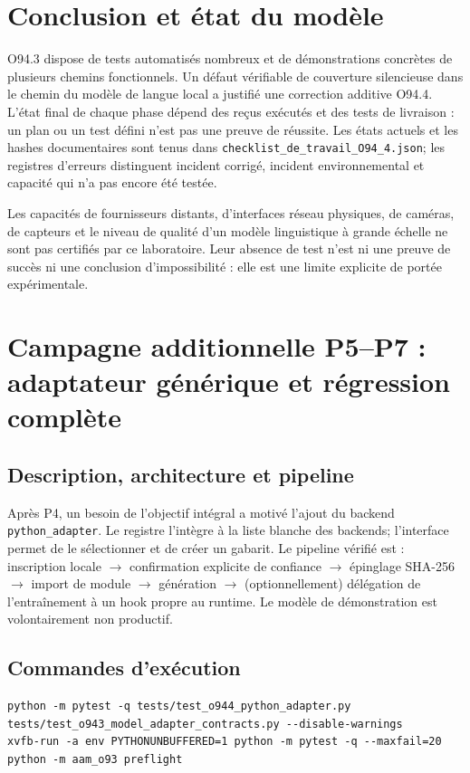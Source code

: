 \documentclass[11pt,a4paper]{article}
\begin{document}
\section{Conclusion et état du modèle}
O94.3 dispose de tests automatisés nombreux et de démonstrations concrètes de plusieurs chemins fonctionnels. Un défaut vérifiable de couverture silencieuse dans le chemin du modèle de langue local a justifié une correction additive O94.4. L'état final de chaque phase dépend des reçus exécutés et des tests de livraison : un plan ou un test défini n'est pas une preuve de réussite. Les états actuels et les hashes documentaires sont tenus dans \texttt{checklist\_de\_travail\_O94\_4.json}; les registres d'erreurs distinguent incident corrigé, incident environnemental et capacité qui n'a pas encore été testée.

Les capacités de fournisseurs distants, d'interfaces réseau physiques, de caméras, de capteurs et le niveau de qualité d'un modèle linguistique à grande échelle ne sont pas certifiés par ce laboratoire. Leur absence de test n'est ni une preuve de succès ni une conclusion d'impossibilité : elle est une limite explicite de portée expérimentale.
\section{Campagne additionnelle P5--P7 : adaptateur générique et régression complète}
\subsection{Description, architecture et pipeline}
Après P4, un besoin de l'objectif intégral a motivé l'ajout du backend \texttt{python\_adapter}. Le registre l'intègre à la liste blanche des backends; l'interface permet de le sélectionner et de créer un gabarit. Le pipeline vérifié est : inscription locale $\to$ confirmation explicite de confiance $\to$ épinglage SHA-256 $\to$ import de module $\to$ génération $\to$ (optionnellement) délégation de l'entraînement à un hook propre au runtime. Le modèle de démonstration est volontairement non productif.

\subsection{Commandes d'exécution}
\begin{verbatim}
python -m pytest -q tests/test_o944_python_adapter.py tests/test_o943_model_adapter_contracts.py --disable-warnings
xvfb-run -a env PYTHONUNBUFFERED=1 python -m pytest -q --maxfail=20
python -m aam_o93 preflight
\end{verbatim}
\end{document}
